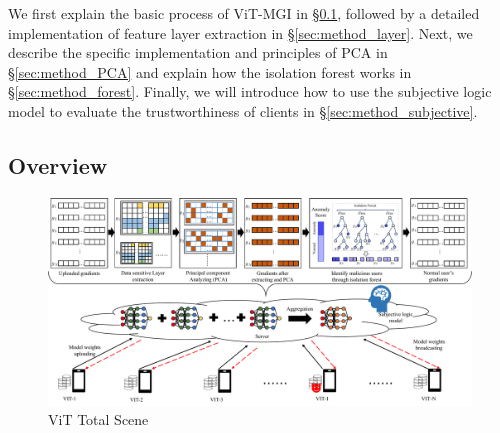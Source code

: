 \documentclass[conference]{IEEEtran}
\def\figTotalScene{\textwidth}
\begin{document}
We first explain the basic process of ViT-MGI in \hyperref[sec:method_basic]{§\ref{sec:method_basic}}, followed by a detailed implementation of feature layer extraction in \hyperref[sec:method_layer]{§\ref{sec:method_layer}}. Next, we describe the specific implementation and principles of PCA in \hyperref[sec:method_PCA]{§\ref{sec:method_PCA}} and explain how the isolation forest works in \hyperref[sec:method_forest]{§\ref{sec:method_forest}}. Finally, we will introduce how to use the subjective logic model to evaluate the trustworthiness of clients in \hyperref[sec:method_subjective]{§\ref{sec:method_subjective}}.

\subsection{Overview}
\label{sec:method_basic}

\begin{figure}[htbp]
    \centerline{\includegraphics[width=\figTotalScene]{pics/000-totalScene.pdf}}
    \vspace{-10px}  %
    \caption{ViT Total Scene}
    \label{fig:totalScene}
    \vspace{-20px}
\end{figure}


\end{document}
